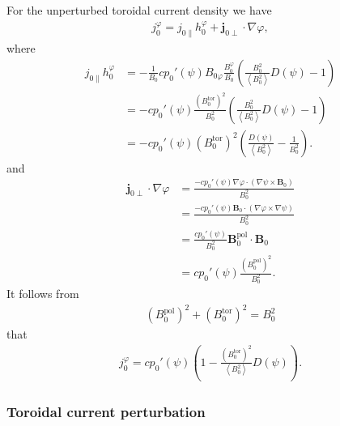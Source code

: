 \documentclass[a4paper, 10pt, english]{article}
\let\temp\vartheta
\let\vartheta\theta
\let\theta\temp
\let\temp\varphi
\let\varphi\phi
\let\phi\temp
\let\vec\symbf
\newcommand*\pol{\ensuremath{\textrm{pol}}}
\newcommand*\tor{\ensuremath{\textrm{tor}}}
\begin{document}
For the unperturbed toroidal current density we have
\begin{gather}
  j_{0}^{\phi} = j_{0 \parallel} h_{0}^{\phi} + \vec{j}_{0 \perp} \cdot \nabla \phi,
\end{gather}
where
\begin{align}
  j_{0 \parallel} h_{0}^{\phi} &= -\frac{1}{B_{0}} c p_{0}'(\psi) B_{0 \phi} \frac{B_{0}^{\phi}}{B_{0}} \left( \frac{B_{0}^{2}}{\left\langle B_{0}^{2} \right\rangle} D(\psi) - 1 \right) \nonumber \\
  &= -c p_{0}'(\psi) \frac{\left( B_{0}^{\tor} \right)^{2}}{B_0^2} \left( \frac{B_{0}^{2}}{\left\langle B_{0}^{2} \right\rangle} D(\psi) - 1 \right) \nonumber \\
  &= -c p_{0}'(\psi) \left( B_{0}^{\tor} \right)^{2} \left( \frac{D(\psi)}{\left\langle B_{0}^{2} \right\rangle} - \frac{1}{B_{0}^{2}} \right).
\end{align}
and
\begin{align}
  \vec{j}_{0 \perp} \cdot \nabla \phi &= \frac{-c p_{0}'(\psi) \nabla \phi \cdot (\nabla \psi \times \vec{B}_{0})}{B_{0}^{2}} \nonumber \\
  &= \frac{-c p_{0}'(\psi) \vec{B}_{0} \cdot (\nabla \phi \times \nabla \psi)}{B_{0}^{2}} \\
  &= \frac{c p_{0}'(\psi)}{B_{0}^{2}} \vec{B}_{0}^{\pol} \cdot \vec{B}_{0} \nonumber \\
  &= c p_{0}'(\psi) \frac{\left( B_{0}^{\pol} \right)^{2}}{B_{0}^{2}}.
\end{align}
It follows from
\begin{gather}
  \left( B_{0}^{\pol} \right)^{2} + \left( B_{0}^{\tor} \right)^{2} = B_{0}^{2}
\end{gather}
that
\begin{gather}
  j_{0}^{\phi} = c p_{0}'(\psi) \left( 1 - \frac{\left( B_{0}^{\tor} \right)^{2}}{\left\langle B_{0}^{2} \right\rangle} D(\psi) \right).
\end{gather}

\subsubsection{Toroidal current perturbation}
\end{document}
